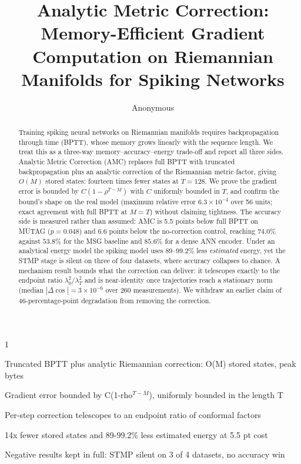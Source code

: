 \documentclass[a4paper,fleqn]{cas-dc}
\begin{document}
\title[mode=title]{Analytic Metric Correction: Memory-Efficient Gradient Computation on Riemannian Manifolds for Spiking Networks}

\author[1]{Anonymous}%
\cormark[1]
 {1}




\begin{highlights}
\item Truncated BPTT plus analytic Riemannian correction: O(M) stored states, peak bytes
\item Gradient error bounded by C(1-rho$^{T-M}$), uniformly bounded in the length T
\item Per-step correction telescopes to an endpoint ratio of conformal factors
\item 14x fewer stored states and 89-99.2\% less estimated energy at 5.5 pt cost
\item Negative results kept in full: STMP silent on 3 of 4 datasets, no accuracy win
\end{highlights}

\begin{abstract}
Training spiking neural networks on Riemannian manifolds requires backpropagation through time (BPTT), whose memory grows linearly with the sequence length. We treat this as a three-way memory--accuracy--energy trade-off and report all three sides. Analytic Metric Correction (AMC) replaces full BPTT with truncated backpropagation plus an analytic correction of the Riemannian metric factor, giving $O(M)$ stored states: fourteen times fewer states at $T{=}128$. We prove the gradient error is bounded by $C(1-\rho^{T-M})$ with $C$ uniformly bounded in $T$, and confirm the bound's shape on the real model (maximum relative error $6.3\times10^{-4}$ over 56 units; exact agreement with full BPTT at $M{=}T$) without claiming tightness. The accuracy side is measured rather than assumed: AMC is 5.5 points below full BPTT on MUTAG ($p{=}0.048$) and 6.6 points below the no-correction control, reaching $74.0\%$ against $53.8\%$ for the MSG baseline and $85.6\%$ for a dense ANN encoder. Under an analytical energy model the spiking model uses $89$--$99.2\%$ less \emph{estimated} energy, yet the STMP stage is silent on three of four datasets, where accuracy collapses to chance. A mechanism result bounds what the correction can deliver: it telescopes exactly to the endpoint ratio $\lambda_0^2/\lambda_T^2$ and is near-identity once trajectories reach a stationary norm (median $|\Delta\cos|=3\times10^{-6}$ over 260 measurements). We withdraw an earlier claim of 46-percentage-point degradation from removing the correction.
\end{abstract}
\end{document}
